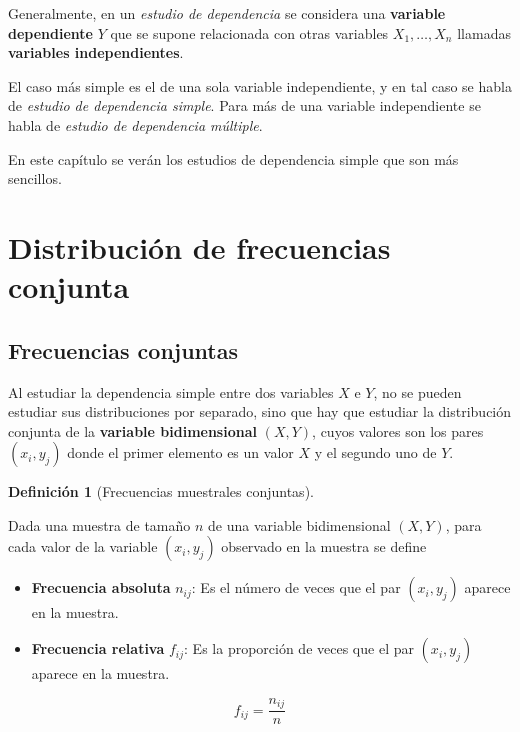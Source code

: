 \documentclass[
  a4paper,
]{scrreport}
\providecommand{\tightlist}{%
  \setlength{\itemsep}{0pt}\setlength{\parskip}{0pt}}\usepackage{longtable,booktabs,array}
\theoremstyle{plain}
\theoremstyle{definition}
\newtheorem{definition}{Definición}[chapter]
\theoremstyle{definition}
\theoremstyle{remark}
\begin{document}
Generalmente, en un \emph{estudio de dependencia} se considera una
\textbf{variable dependiente} \(Y\) que se supone relacionada con otras
variables \(X_1,\ldots,X_n\) llamadas \textbf{variables independientes}.

El caso más simple es el de una sola variable independiente, y en tal
caso se habla de \emph{estudio de dependencia simple}. Para más de una
variable independiente se habla de \emph{estudio de dependencia
múltiple}.

En este capítulo se verán los estudios de dependencia simple que son más
sencillos.

\section{Distribución de frecuencias
conjunta}\label{distribuciuxf3n-de-frecuencias-conjunta}

\subsection{Frecuencias conjuntas}\label{frecuencias-conjuntas}

Al estudiar la dependencia simple entre dos variables \(X\) e \(Y\), no
se pueden estudiar sus distribuciones por separado, sino que hay que
estudiar la distribución conjunta de la \textbf{variable bidimensional}
\((X,Y)\), cuyos valores son los pares \((x_i,y_j)\) donde el primer
elemento es un valor \(X\) y el segundo uno de \(Y\).

\begin{definition}[Frecuencias muestrales
conjuntas]\protect\hypertarget{def-frecuencias-muestrales-conjuntas}{}\label{def-frecuencias-muestrales-conjuntas}

Dada una muestra de tamaño \(n\) de una variable bidimensional
\((X,Y)\), para cada valor de la variable \((x_i,y_j)\) observado en la
muestra se define

\begin{itemize}
\tightlist
\item
  \textbf{Frecuencia absoluta} \(n_{ij}\): Es el número de veces que el
  par \((x_i,y_j)\) aparece en la muestra.
\item
  \textbf{Frecuencia relativa} \(f_{ij}\): Es la proporción de veces que
  el par \((x_i,y_j)\) aparece en la muestra.
\end{itemize}

\[f_{ij}=\frac{n_{ij}}{n}\]

\end{definition}
\end{document}
